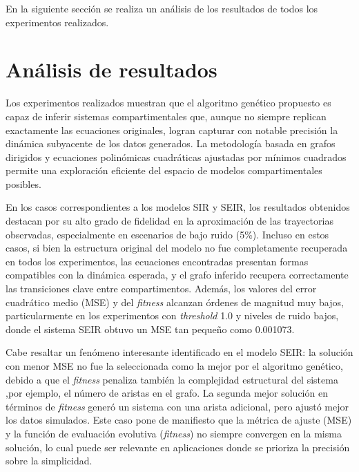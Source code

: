 En la siguiente sección se realiza un análisis de los resultados de todos
los experimentos realizados.

\section{An\'alisis de resultados}
\label{sec:experimentation4}

Los experimentos realizados muestran que el algoritmo genético propuesto es capaz de inferir sistemas compartimentales que, aunque no siempre replican exactamente las ecuaciones originales, logran capturar con notable precisión la dinámica subyacente de los datos generados. La metodología basada en grafos dirigidos y ecuaciones polinómicas cuadráticas ajustadas por mínimos cuadrados permite una exploración eficiente del espacio de modelos compartimentales posibles.

En los casos correspondientes a los modelos SIR y SEIR, los resultados obtenidos destacan por su alto grado de fidelidad en la aproximación de las trayectorias observadas, especialmente en escenarios de bajo ruido (5\%). Incluso en estos casos, si bien la estructura original del modelo no fue completamente recuperada en todos los experimentos, las ecuaciones encontradas presentan formas compatibles con la dinámica esperada, y el grafo inferido recupera correctamente las transiciones clave entre compartimentos. Además, los valores del error cuadrático medio (MSE) y del \textit{fitness} alcanzan órdenes de magnitud muy bajos, particularmente en los experimentos con \textit{threshold} 1.0 y niveles de ruido bajos, donde el sistema SEIR obtuvo un MSE tan pequeño como 0.001073.

Cabe resaltar un fenómeno interesante identificado en el modelo SEIR: la solución con menor MSE no fue la seleccionada como la mejor por el algoritmo genético, debido a que el \textit{fitness} penaliza también la complejidad estructural del sistema ,por ejemplo, el número de aristas en el grafo. La segunda mejor solución en términos de \textit{fitness} generó un sistema con una arista adicional, pero ajustó mejor los datos simulados. Este caso pone de manifiesto que la métrica de ajuste (MSE) y la función de evaluación evolutiva (\textit{fitness}) no siempre convergen en la misma solución, lo cual puede ser relevante en aplicaciones donde se prioriza la precisión sobre la simplicidad.

